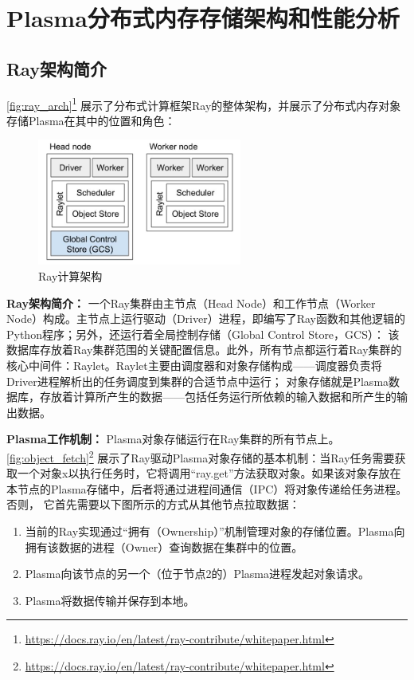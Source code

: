 \chapter{Plasma分布式内存存储架构和性能分析}

\section{Ray架构简介}

\autoref{fig:ray_arch}\footnote{\url{https://docs.ray.io/en/latest/ray-contribute/whitepaper.html}}
展示了分布式计算框架Ray的整体架构，并展示了分布式内存对象存储Plasma在其中的位置和角色：

\begin{figure}[h] 
    \centering
    \includegraphics[width=0.6\textwidth]{image/chap02/ray_arch.png}
    \caption{Ray计算架构}
    \label{fig:ray_arch}
\end{figure}

\textbf{Ray架构简介：}
一个Ray集群由主节点（Head Node）和工作节点（Worker Node）构成。主节点上运行驱动（Driver）进程，即编写了Ray函数和其他逻辑的Python程序；另外，还运行着全局控制存储（Global Control Store，GCS）：
该数据库存放着Ray集群范围的关键配置信息。此外，所有节点都运行着Ray集群的核心中间件：Raylet。Raylet主要由调度器和对象存储构成——调度器负责将Driver进程解析出的任务调度到集群的合适节点中运行；
对象存储就是Plasma数据库，存放着计算所产生的数据——包括任务运行所依赖的输入数据和所产生的输出数据。

\textbf{Plasma工作机制：}
Plasma对象存储运行在Ray集群的所有节点上。\autoref{fig:object_fetch}\footnote{\url{https://docs.ray.io/en/latest/ray-contribute/whitepaper.html}}
展示了Ray驱动Plasma对象存储的基本机制：当Ray任务需要获取一个对象x以执行任务时，它将调用“ray.get”方法获取对象。如果该对象存放在本节点的Plasma存储中，后者将通过进程间通信（IPC）将对象传递给任务进程。否则，
它首先需要以下图所示的方式从其他节点拉取数据：

\begin{enumerate}
    \item 当前的Ray实现通过“拥有（Ownership）”机制管理对象的存储位置。Plasma向拥有该数据的进程（Owner）查询数据在集群中的位置。
    \item Plasma向该节点的另一个（位于节点2的）Plasma进程发起对象请求。
    \item Plasma将数据传输并保存到本地。
\end{enumerate}

